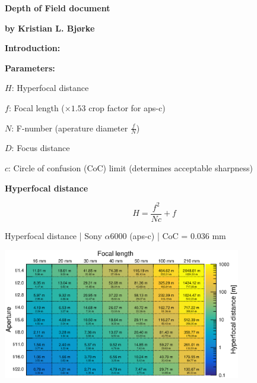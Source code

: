 \documentclass[aspectratio=169]{beamer}
\begin{document}

\begin{frame}[plain]{}
  \vspace{3ex}
  \begin{center} \Huge \bf
    Depth of Field document
  \end{center}
  \begin{center} \Large \bf
    by Kristian L. Bjørke
  \end{center}

  {\large \bf
    Introduction:
  }

  {\large \bf
    Parameters:
  }

  {
    \small
    $H$: Hyperfocal distance

    $f$: Focal length ($\times 1.53$ crop factor for aps-c)

    $N$: F-number (aperature diameter $\frac{f}{N}$)

    $D$: Focus distance 

    $c$: Circle of confusion (CoC) limit (determines acceptable sharpness)
  }
\end{frame}


\begin{frame}[plain]{}
  \vspace{3ex}
  \begin{center} \LARGE \bf
    Hyperfocal distance
  \end{center}

  { \Large
    $$\mathit{H = \frac{f^2}{Nc} + f}$$
  }

\end{frame}

\begin{frame}[plain]{}
  \vspace{1ex}
  \centering
  Hyperfocal distance | Sony $\alpha$\hspace{0.1em}6000 (aps-c) | CoC = 0.036 mm
  
  \includegraphics[center,width=0.78\textwidth]{img/hyperfocal-distance.eps}
\end{frame}
\end{document}
